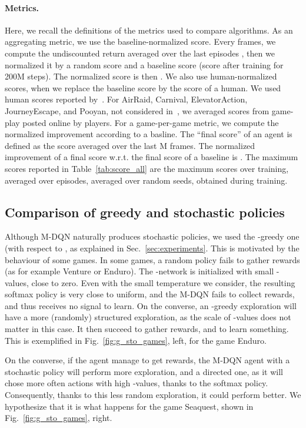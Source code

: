 \documentclass{article}
\begin{document}
\paragraph{Metrics.} Here, we recall the definitions of the metrics used to compare algorithms. As an aggregating metric, we use the baseline-normalized score. Every  frames, we compute the undiscounted return averaged over the last  episodes , then we normalized it by a random score  and a baseline score  (score after training for 200M steps). The normalized score is then .  We also use human-normalized scores, when we replace the baseline score by the score of a human. We used human scores reported by~\cite{mnih2015human}. For AirRaid, Carnival, ElevatorAction, JourneyEscape, and Pooyan, not considered in~\citet{mnih2015human}, we averaged scores from game-play posted online by players. 
For a game-per-game metric, we compute the normalized improvement according to a basline. The ``final score'' of an agent is defined as the score averaged over the last M frames. The normalized improvement of a final score  w.r.t. the final score of a baseline  is .
The maximum scores reported in Table~\ref{tab:score_all} are the maximum scores over training, averaged over  episodes, averaged over  random seeds, obtained during training.




\subsection{Comparison of greedy and stochastic policies}
\label{subappx:comparison}

Although M-DQN naturally produces stochastic policies, we used the -greedy one (with respect to , as explained in Sec.~\ref{sec:experiments}. This is motivated by the behaviour of some games. In some games, a random policy fails to gather rewards (as for example Venture or Enduro). The -network is initialized with small -values, close to zero. Even with the small temperature  we consider, the resulting softmax policy is very close to uniform, and the M-DQN fails to collect rewards, and thus receives no signal to learn. On the converse, an -greedy exploration will have a more (randomly) structured exploration, as the scale of -values does not matter in this case. It then succeed to gather rewards, and to learn something. This is exemplified in Fig.~\ref{fig:g_sto_games}, left, for the game Enduro.

On the converse, if the agent manage to get rewards, the M-DQN agent with a stochastic policy will perform more exploration, and a directed one, as it will chose more often actions with high -values, thanks to the softmax policy. Consequently, thanks to this less random exploration, it could perform better. We hypothesize that it is what happens for the game Seaquest, shown in Fig.~\ref{fig:g_sto_games}, right.
\end{document}
